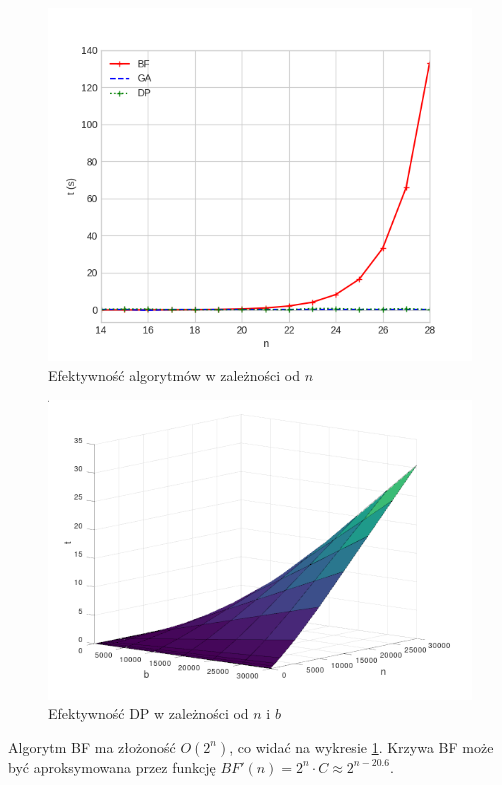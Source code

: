 \documentclass[12pt,twocolumn]{article}
\begin{document}
\begin{figure}[h]
	\includegraphics[width=\linewidth]{speed-n.png}
	\caption{Efektywność algorytmów w zależności od $n$ \label{speed_n}}
\end{figure}

\begin{figure}[h]
	\includegraphics[width=\linewidth]{speed-bn.png}
	\caption{Efektywność DP w zależności od $n$ i $b$ \label{speed_bn}}
\end{figure}

Algorytm BF ma złożoność $O(2^n)$, co widać na wykresie \ref{speed_n}.
Krzywa BF może być aproksymowana przez funkcję
$BF'(n) = 2^n \cdot C \approx 2^{n - 20.6}$.
\end{document}
